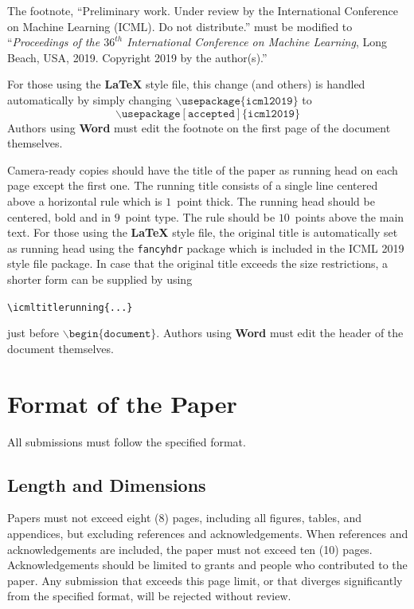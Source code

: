 \documentclass{article}
\begin{document}
The footnote, ``Preliminary work. Under review by the International
Conference on Machine Learning (ICML). Do not distribute.'' must be
modified to ``\textit{Proceedings of the
$\mathit{36}^{th}$ International Conference on Machine Learning},
Long Beach, USA, 2019.
Copyright 2019 by the author(s).''

For those using the \textbf{\LaTeX} style file, this change (and others) is
handled automatically by simply changing
$\mathtt{\backslash usepackage\{icml2019\}}$ to
$$\mathtt{\backslash usepackage[accepted]\{icml2019\}}$$
Authors using \textbf{Word} must edit the
footnote on the first page of the document themselves.

Camera-ready copies should have the title of the paper as running head
on each page except the first one. The running title consists of a
single line centered above a horizontal rule which is $1$~point thick.
The running head should be centered, bold and in $9$~point type. The
rule should be $10$~points above the main text. For those using the
\textbf{\LaTeX} style file, the original title is automatically set as running
head using the \texttt{fancyhdr} package which is included in the ICML
2019 style file package. In case that the original title exceeds the
size restrictions, a shorter form can be supplied by using

\verb|\icmltitlerunning{...}|

just before $\mathtt{\backslash begin\{document\}}$.
Authors using \textbf{Word} must edit the header of the document themselves.

\section{Format of the Paper}

All submissions must follow the specified format.

\subsection{Length and Dimensions}

Papers must not exceed eight (8) pages, including all figures, tables,
and appendices, but excluding references and acknowledgements. When references and acknowledgements are included,
the paper must not exceed ten (10) pages.
Acknowledgements should be limited to grants and people who contributed to the paper.
Any submission that exceeds
this page limit, or that diverges significantly from the specified format,
will be rejected without review.
\end{document}
